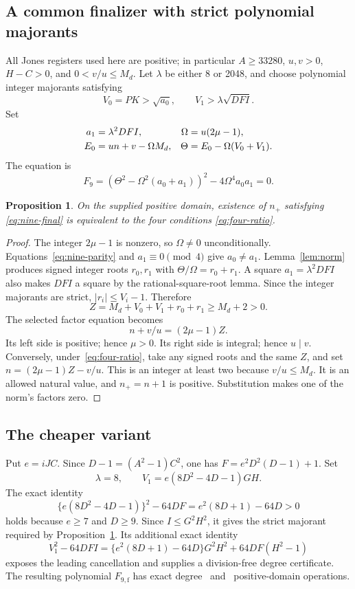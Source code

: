 \documentclass[11pt,a4paper]{article}
\newtheorem{proposition}[theorem]{Proposition}
\theoremstyle{definition}\newtheorem{definition}[theorem]{Definition}
\theoremstyle{remark}\newtheorem{remark}[theorem]{Remark}
\begin{document}
\subsection{A common finalizer with strict polynomial majorants}

All Jones registers used here are positive; in particular $A\ge33280$,
$u,v>0$, $H-C>0$, and $0<v/u\le M_d$. Let $\lambda$ be either 8 or 2048,
and choose polynomial integer majorants satisfying
\[
 V_0=PK>\sqrt{a_0},\qquad V_1>\lambda\sqrt{DFI}.
\]
Set
\begin{align}
 a_1&=\lambda^2DFI,& \Omega&=u(2\mu-1),\notag\\
 E_0&=un+v-\Omega M_d,&
 \Theta&=E_0-\Omega(V_0+V_1).
 \label{eq:nine-final-registers}
\end{align}
The equation is
\begin{equation}\boxed{
 F_9=\left(\Theta^2-\Omega^2(a_0+a_1)\right)^2
       -4\Omega^4a_0a_1=0.
 }\label{eq:nine-final}
\end{equation}

\begin{proposition}\label{prop:nine-final}
On the supplied positive domain, existence of $n_+$ satisfying
\eqref{eq:nine-final} is equivalent to the four conditions
\eqref{eq:four-ratio}.
\end{proposition}
\begin{proof}
The integer $2\mu-1$ is nonzero, so $\Omega\ne0$ unconditionally.
Equations~\eqref{eq:nine-parity} and $a_1\equiv0\pmod4$ give
$a_0\ne a_1$. Lemma~\ref{lem:norm} produces signed integer roots
$r_0,r_1$ with $\Theta/\Omega=r_0+r_1$. A square $a_1=\lambda^2DFI$
also makes $DFI$ a square by the rational-square-root lemma.
Since the integer majorants are strict, $|r_i|\le V_i-1$. Therefore
\[
 Z=M_d+V_0+V_1+r_0+r_1\ge M_d+2>0.
\]
The selected factor equation becomes
\[
 n+v/u=(2\mu-1)Z.
\]
Its left side is positive; hence $\mu>0$. Its right side is integral;
hence $u\mid v$. Conversely, under~\eqref{eq:four-ratio}, take any
signed roots and the same $Z$, and set
$n=(2\mu-1)Z-v/u$. This is an integer at least two because
$v/u\le M_d$. It is an allowed natural value, and $n_+=n+1$ is positive.
Substitution makes one of the norm's factors zero.
\end{proof}

\subsection{The cheaper variant}

Put $e=iJC$. Since $D-1=(A^2-1)C^2$, one has
$F=e^2D^2(D-1)+1$. Set
\[
 \lambda=8,\qquad V_1=e(8D^2-4D-1)GH.
\]
The exact identity
\begin{equation}\label{eq:fast-defect}
 \{e(8D^2-4D-1)\}^2-64DF=e^2(8D+1)-64D>0
\end{equation}
holds because $e\ge7$ and $D\ge9$. Since $I\le G^2H^2$, it gives the
strict majorant required by Proposition~\ref{prop:nine-final}.
Its additional exact identity
\[
 V_1^2-64DFI=\{e^2(8D+1)-64D\}G^2H^2+64DF(H^2-1)
\]
exposes the leading cancellation and supplies a division-free degree
certificate. The resulting polynomial $F_{9,\mathrm f}$ has exact degree
\FastDegree\ and \FastOps\ positive-domain operations.
\end{document}
